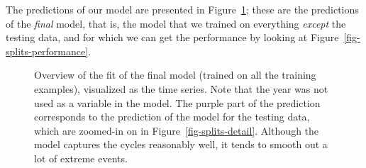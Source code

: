 \documentclass[
  letterpaper,
]{scrbook}
\begin{document}
The predictions of our model are presented in
Figure~\ref{fig-splits-prediction}; these are the predictions of the
\emph{final} model, that is, the model that we trained on everything
\emph{except} the testing data, and for which we can get the performance
by looking at Figure~\ref{fig-splits-performance}.

\begin{figure}[pbt]


\caption{\label{fig-splits-prediction}Overview of the fit of the final
model (trained on all the training examples), visualized as the time
series. Note that the year was not used as a variable in the model. The
purple part of the prediction corresponds to the prediction of the model
for the testing data, which are zoomed-in on in
Figure~\ref{fig-splits-detail}. Although the model captures the cycles
reasonably well, it tends to smooth out a lot of extreme events.}

\end{figure}%
\end{document}
